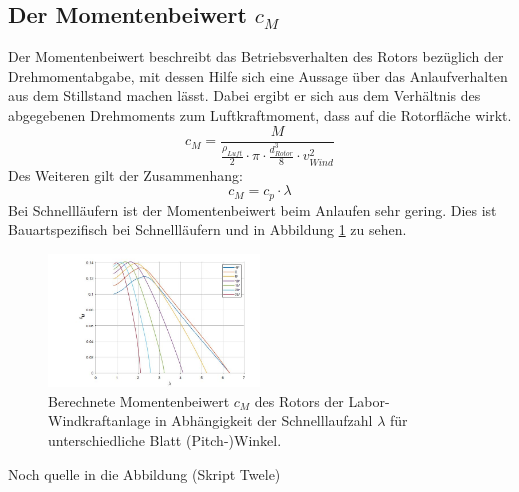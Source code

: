 \subsection{Der Momentenbeiwert \texorpdfstring{$c_M$}{}}
Der Momentenbeiwert beschreibt das Betriebsverhalten des Rotors bezüglich der Drehmomentabgabe, mit dessen Hilfe sich eine Aussage über das Anlaufverhalten aus dem Stillstand machen lässt. Dabei ergibt er sich aus dem Verhältnis des abgegebenen Drehmoments zum Luftkraftmoment, dass auf die Rotorfläche wirkt.
\begin{equation}
  c_{M}= \frac{M}{ \frac{\rho_{Luft}}{2}\cdot \pi \cdot \frac{d^3_{Rotor}}{8} \cdot v^2_{Wind} }
    \label{eq:Momentenbeiwert_cm}
\end{equation}
Des Weiteren gilt der Zusammenhang:
\begin{equation}
  c_{M}= c_{p} \cdot \lambda
    \label{eq:Momentenbeiwert_cm2}
\end{equation}
Bei Schnellläufern ist der Momentenbeiwert beim Anlaufen sehr gering. Dies ist Bauartspezifisch bei Schnellläufern und in Abbildung \ref{fig:cmzulambda} zu sehen.
\begin{figure}[h!]
    \centering
    \includegraphics[width=0.5\textwidth]{Abbildungen/cm.jpg}
    \caption{Berechnete Momentenbeiwert $c_{M}$ des Rotors der Labor-Windkraftanlage in Abhängigkeit der Schnelllaufzahl $\lambda$ für unterschiedliche Blatt (Pitch-)Winkel.\cite{Anleitung} }
    \label{fig:cmzulambda}
\end{figure}
Noch quelle in die Abbildung (Skript Twele)

